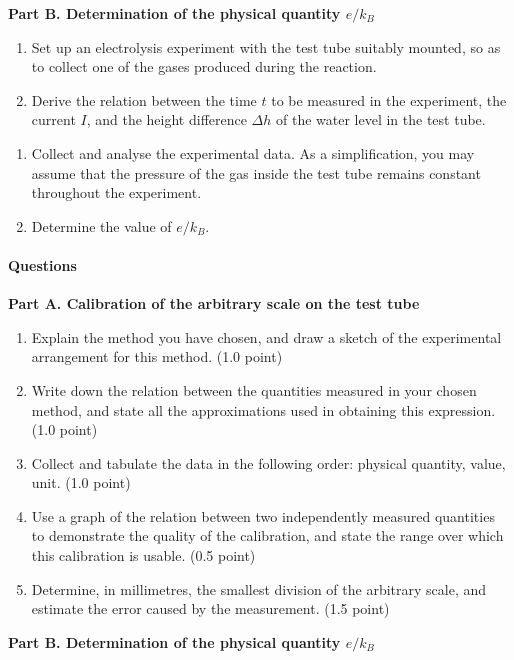 \textbf{Part B. Determination of the physical quantity $e/k_B$}

\begin{enumerate}[label=(\arabic*)]
\item Set up an electrolysis experiment with the test tube suitably mounted, so as to collect one of the gases produced during the reaction.
\item Derive the relation between the time $t$ to be measured in the experiment, the current $I$, and the height difference $\Delta h$ of the water level in the test tube.
\end{enumerate}

\begin{enumerate}[label=(\arabic*),start=3]
\item Collect and analyse the experimental data. As a simplification, you may assume that the pressure of the gas inside the test tube remains constant throughout the experiment.
\item Determine the value of $e/k_B$.
\end{enumerate}

\paragraph{Questions}

\textbf{Part A. Calibration of the arbitrary scale on the test tube}

\begin{enumerate}[label=(\arabic*)]
\item Explain the method you have chosen, and draw a sketch of the experimental arrangement for this method. (1.0 point)
\item Write down the relation between the quantities measured in your chosen method, and state all the approximations used in obtaining this expression. (1.0 point)
\item Collect and tabulate the data in the following order: physical quantity, value, unit. (1.0 point)
\item Use a graph of the relation between two independently measured quantities to demonstrate the quality of the calibration, and state the range over which this calibration is usable. (0.5 point)
\item Determine, in millimetres, the smallest division of the arbitrary scale, and estimate the error caused by the measurement. (1.5 point)
\end{enumerate}

\textbf{Part B. Determination of the physical quantity $e/k_B$}

